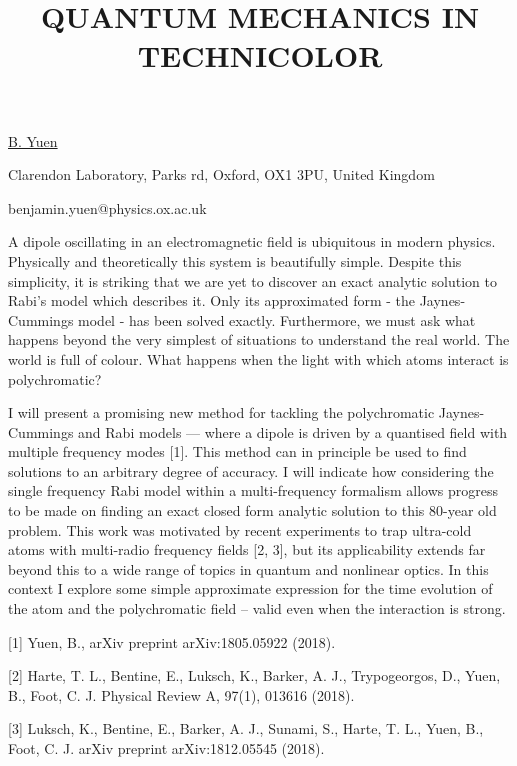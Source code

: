 \title{QUANTUM MECHANICS IN TECHNICOLOR}

\underline{B. Yuen}  

{\normalsize{\vspace{-4mm}
Clarendon Laboratory,
Parks rd,
Oxford,
OX1 3PU,
United Kingdom



\email benjamin.yuen@physics.ox.ac.uk}}

A dipole oscillating in an electromagnetic field is ubiquitous in modern physics. Physically and theoretically this system is beautifully simple. Despite this simplicity, it is striking that we are yet to discover an exact analytic solution to Rabi’s model which describes it. Only its approximated form - the Jaynes-Cummings model - has been solved exactly. Furthermore, we must ask what happens beyond the very simplest of situations to understand the real world.  The world is full of colour. What happens when the light with which atoms interact is polychromatic?

I will present a promising new method for tackling the polychromatic Jaynes-Cummings and Rabi models — where a dipole is driven by a quantised field with multiple frequency modes [1]. This method can in principle be used to find solutions to an arbitrary degree of accuracy. I will indicate how considering the single frequency Rabi model within a multi-frequency formalism allows progress to be made on finding an exact closed form analytic solution to this 80-year old problem. This work was motivated by recent experiments to trap ultra-cold atoms with multi-radio frequency fields [2, 3], but its applicability extends far beyond this to a wide range of topics in quantum and nonlinear optics. In this context I explore some simple approximate expression for the time evolution of the atom and the polychromatic field -- valid even when the interaction is strong.

{\normalsize
[1] Yuen, B., arXiv preprint arXiv:1805.05922 (2018).
\vsp

[2] Harte, T. L., Bentine, E., Luksch, K., Barker, A. J., Trypogeorgos, D., Yuen, B., Foot, C. J. Physical Review A, 97(1), 013616 (2018).
\vsp

[3] Luksch, K., Bentine, E., Barker, A. J., Sunami, S., Harte, T. L., Yuen, B., Foot, C. J. arXiv preprint arXiv:1812.05545 (2018).
}

\vspace{\baselineskip}